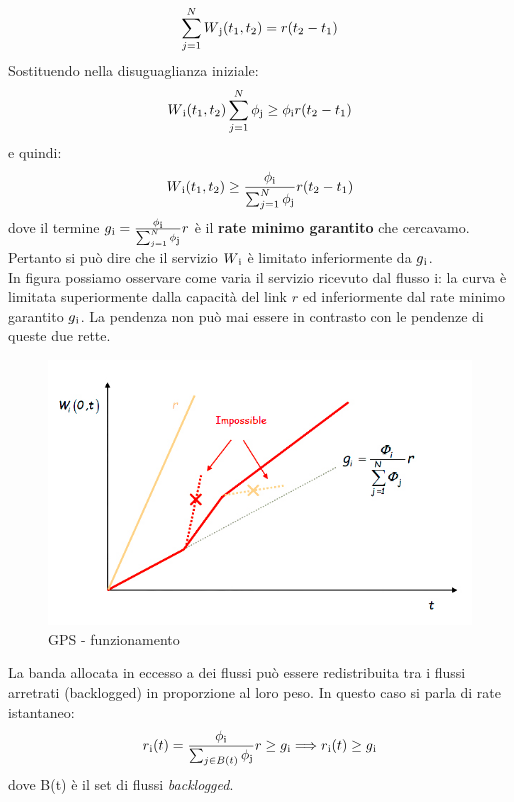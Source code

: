 \documentclass{article}
\begin{document}
\[ \sum_{j=1}^{N} W\textsubscript{j}(t\textsubscript{1}, t\textsubscript{2}) = r(t\textsubscript{2} - t\textsubscript{1}) \]
Sostituendo nella disuguaglianza iniziale:
\[ W\textsubscript{i}(t\textsubscript{1}, t\textsubscript{2})\sum_{j=1}^{N} \phi\textsubscript{j} \geq
\phi\textsubscript{i} r(t\textsubscript{2} - t\textsubscript{1}) \]
e quindi:
\[ W\textsubscript{i}(t\textsubscript{1}, t\textsubscript{2}) \geq \frac{\phi\textsubscript{i}}{\sum_{j=1}^{N} \phi\textsubscript{j}}r(t\textsubscript{2} - t\textsubscript{1})\]
dove il termine \( g\textsubscript{i} = \frac{\phi\textsubscript{i}}{\sum_{j=1}^{N} \phi\textsubscript{j}}r \) è il \textbf{rate minimo garantito} che cercavamo. \\
Pertanto si può dire che il servizio \(W\textsubscript{i}\) è limitato inferiormente da \( g\textsubscript{i}\).\\
In figura possiamo osservare come varia il servizio ricevuto dal flusso i: la curva è limitata superiormente dalla capacità del link \( r\) ed inferiormente dal rate minimo garantito \( g\textsubscript{i} \). La pendenza non può mai essere in contrasto con le pendenze di queste due rette.
\begin{figure}[H]
    \centering
    \includegraphics[scale=0.5]{figures/gps_rate.jpg}
    \caption{GPS - funzionamento}
\end{figure}
\noindent La banda allocata in eccesso a dei flussi può essere redistribuita tra i flussi arretrati (backlogged) in proporzione al loro peso. In questo caso si parla di rate istantaneo:
\[
r\textsubscript{i}(t) = \frac{\phi\textsubscript{i}}{\sum_{j \in B(t)} \phi\textsubscript{j}}r \geq g\textsubscript{i} \Longrightarrow r\textsubscript{i}(t) \geq g\textsubscript{i} 
\]
dove B(t) è il set di flussi \textit{backlogged}.\\
\end{document}
